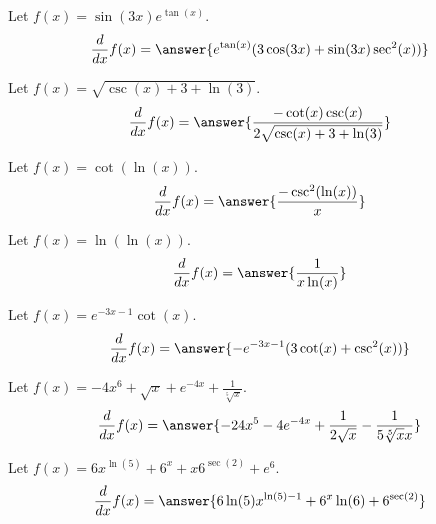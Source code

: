 \documentclass{ximera}
\begin{document}
\begin{shuffle}
\begin{exercise}
\begin{exercise}
Let $f(x)=\sin (3 x) e^{\tan (x)}$.
\[
\ddx f(x) = \answer{e^{\tan (x)} (3 \cos (3 x)+\sin (3 x) \sec ^2(x))}
\]
\end{exercise}

\begin{exercise}
Let $f(x)=\sqrt{\csc (x)+3+\ln (3)}$.
\[
\ddx f(x) = \answer{\frac{-\cot (x) \csc (x)}{2 \sqrt{\csc (x)+3+\ln (3)}}}
\]
\end{exercise}

\begin{exercise}
Let $f(x)=\cot (\ln (x))$.
\[
\ddx f(x) = \answer{\frac{-\csc ^2(\ln (x))}{x}}
\]
\end{exercise}

\begin{exercise}
Let $f(x)=\ln (\ln (x))$.
\[
\ddx f(x) = \answer{\frac{1}{x \ln (x)}}
\]
\end{exercise}

\begin{exercise}
Let $f(x)=e^{-3 x-1} \cot (x)$.
\[
\ddx f(x) = \answer{-e^{-3 x-1} (3 \cot (x)+\csc ^2(x))}
\]
\end{exercise}

\begin{exercise}
Let $f(x)=-4 x^6+\sqrt{x}+e^{-4 x}+\frac{1}{\sqrt[5]{x}}$.
\[
\ddx f(x) = \answer{-24 x^5-4 e^{-4 x}+\frac{1}{2 \sqrt{x}}-\frac{1}{5 \sqrt[5]{x} x}}
\]
\end{exercise}


\begin{exercise}
Let $f(x)=6 x^{\ln (5)}+6^x+x 6^{\sec (2)}+e^6$.
\[
\ddx f(x) = \answer{6 \ln (5) x^{\ln (5)-1}+6^x \ln (6)+6^{\sec (2)}}
\]
\end{exercise}




\end{exercise}
\end{shuffle}
\end{document}
